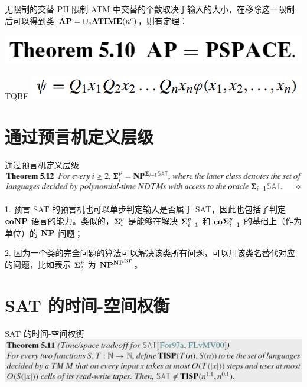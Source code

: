 \documentclass[UTF8,aspectratio=169,mathserif]{beamer}
\begin{document}
	\begin{frame}{无限制的交替}
		PH 限制 ATM 中交替的个数取决于输入的大小，在移除这一限制后可以得到类 ${\bf AP}=\cup_c{\bf ATIME}(n^c)$，则有定理：\newline
		
		\includegraphics[width=0.4\linewidth]{../../5 & 6/note.assets/image-20210427095127253.png}\newline
		
		\begin{block}{TQBF}
			\includegraphics[width=0.5\linewidth]{../../5 & 6/note.assets/image-20210427225640198.png}
		\end{block}
	\end{frame}
	
	\section{通过预言机定义层级}
	\begin{frame}{通过预言机定义层级}
		\includegraphics[width=\linewidth]{../../5 & 6/note.assets/image-20210427130304091.png}\newline
		
		1. 预言 SAT 的预言机也可以单步判定输入是否属于 SAT，因此也包括了判定 $\bf coNP$ 语言的能力。类似的，${\bf\Sigma}_i^p$ 是能够在解决 ${\bf\Sigma}_{i-1}^p$ 和 ${\bf co\Sigma}_{i-1}^p$ 的基础上（作为单位）的 $\bf NP$ 问题；\newline
		
		2. 因为一个类的完全问题的算法可以解决该类所有问题，可以用该类名替代对应的问题，比如表示 ${\bf\Sigma}_3^p$ 为 $\bf NP^{NP^{NP}}$。
	\end{frame}
	
	\section{SAT 的时间-空间权衡}
	\begin{frame}{SAT 的时间-空间权衡}
		\includegraphics[width=\linewidth]{../../5 & 6/note.assets/image-20210427100533327.png}
	\end{frame}
	
\end{document}
